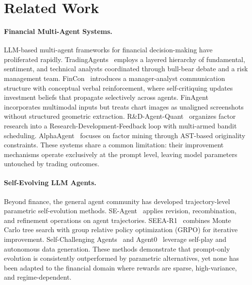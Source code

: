 \section{Related Work}
\label{sec:related}

\paragraph{Financial Multi-Agent Systems.}
LLM-based multi-agent frameworks for financial decision-making have proliferated rapidly. TradingAgents~\cite{tradingagents2025} employs a layered hierarchy of fundamental, sentiment, and technical analysts coordinated through bull-bear debate and a risk management team. FinCon~\cite{fincon2024} introduces a manager-analyst communication structure with conceptual verbal reinforcement, where self-critiquing updates investment beliefs that propagate selectively across agents. FinAgent~\cite{finagent2024} incorporates multimodal inputs but treats chart images as unaligned screenshots without structured geometric extraction. R\&D-Agent-Quant~\cite{rdagent2025} organizes factor research into a Research-Development-Feedback loop with multi-armed bandit scheduling. AlphaAgent~\cite{alphaagent2025} focuses on factor mining through AST-based originality constraints. These systems share a common limitation: their improvement mechanisms operate exclusively at the prompt level, leaving model parameters untouched by trading outcomes.

\paragraph{Self-Evolving LLM Agents.}
Beyond finance, the general agent community has developed trajectory-level parametric self-evolution methods. SE-Agent~\cite{seagent2025} applies revision, recombination, and refinement operations on agent trajectories. SEEA-R1~\cite{seea2025} combines Monte Carlo tree search with group relative policy optimization (GRPO) for iterative improvement. Self-Challenging Agents~\cite{selfchallenge2025} and Agent0~\cite{agent02026} leverage self-play and autonomous data generation. These methods demonstrate that prompt-only evolution is consistently outperformed by parametric alternatives, yet none has been adapted to the financial domain where rewards are sparse, high-variance, and regime-dependent.


